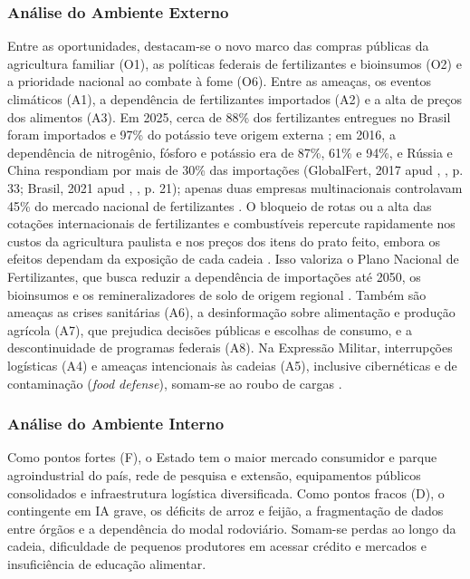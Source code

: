 \documentclass[
	12pt,				%
	openright,			%
	oneside,			%
	a4paper,			%
	chapter=TITLE,		%
	section=TITLE,		%
	english,			%
	french,				%
	spanish,			%
	brazil,				%
 ]{abntex2}
\begin{document}
\subsubsection{Análise do Ambiente Externo}
Entre as oportunidades, destacam-se o novo marco das compras públicas da
agricultura familiar (O1), as políticas federais de fertilizantes e bioinsumos
(O2) e a prioridade nacional ao combate à fome (O6). Entre as ameaças, os eventos
climáticos (A1), a dependência de fertilizantes importados (A2) e a alta de
preços dos alimentos (A3). Em 2025, cerca de 88\% dos fertilizantes entregues no
Brasil foram importados e 97\% do potássio teve origem externa
\cite{cnn_brasil2026}; em 2016, a dependência de nitrogênio, fósforo e potássio
era de 87\%, 61\% e 94\%, e Rússia e China respondiam por mais de 30\% das
importações (GlobalFert, 2017 apud \citeauthor{perez2018}, \citeyear{perez2018}, p. 33; Brasil, 2021
apud \citeauthor{bertolini2022}, \citeyear{bertolini2022}, p. 21); apenas duas empresas multinacionais
controlavam 45\% do mercado nacional de fertilizantes \cite[p. 33]{perez2018}.
O bloqueio de rotas ou a alta das cotações internacionais de fertilizantes e
combustíveis repercute rapidamente nos custos da agricultura paulista e nos
preços dos itens do prato feito, embora os efeitos dependam da exposição de cada
cadeia \cite{fao2022ukraine}. Isso valoriza o Plano Nacional de Fertilizantes,
que busca reduzir a dependência de importações até 2050, os bioinsumos e os
remineralizadores de solo de origem regional \cite{brasil2022fertilizantes}.
Também são ameaças as crises sanitárias (A6), a desinformação sobre alimentação
e produção agrícola (A7), que prejudica decisões públicas e escolhas de consumo,
e a descontinuidade de programas federais (A8).
Na Expressão Militar, interrupções logísticas (A4) e ameaças intencionais às
cadeias (A5), inclusive cibernéticas e de contaminação (\textit{food defense}),
somam-se ao roubo de cargas \cite[p. 48]{perez2018}.

\subsubsection{Análise do Ambiente Interno}
Como pontos fortes (F), o Estado tem o maior mercado consumidor e parque
agroindustrial do país, rede de pesquisa e extensão, equipamentos públicos
consolidados e infraestrutura logística diversificada. Como pontos fracos (D),
o contingente em IA grave, os déficits de arroz e feijão, a fragmentação de
dados entre órgãos e a dependência do modal rodoviário. Somam-se perdas ao
longo da cadeia, dificuldade de pequenos produtores em acessar crédito e
mercados e insuficiência de educação alimentar.
\end{document}
